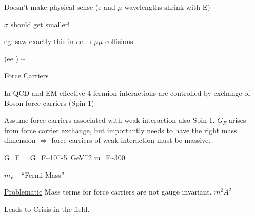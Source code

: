 {Doesn't make physical sense (e and $\mu$ wavelengths shrink with E)

$\sigma$ should get \underline{smaller}!


eg: saw exactly this in $ee\rightarrow \mu\mu$ collisions

\be
\sigma(ee \rightarrow \mu\mu) \sim {}
\ee


\lineacross

\underline{Force Carriers}

In QCD and EM effective 4-fermion interactions are controlled by exchange of Boson force carriers (Spin-1)

Assume force carriers associated with weak interaction also Spin-1. 
$G_F$ arises from force carrier exchange, but importantly needs to have the right mass dimension $\Rightarrow$ force carriers of weak interaction must be massive. 

\be
G_F =  \hspace*{1in}  G_F\sim 10^{-5}\ GeV^2   \Rightarrow m_F\sim 300 \GeV
\ee

$m_F$ - ``Fermi Mass''


\underline{\underline{Problematic}} Mass terms for force carriers are not gauge invariant. $m^2A^2$


Leads to Crisis in the field.

}



